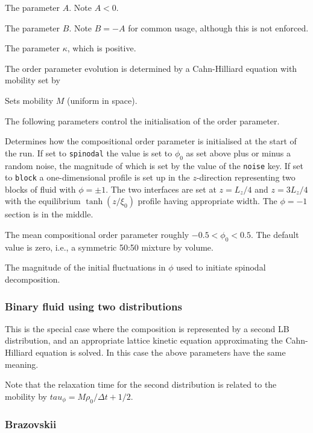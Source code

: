  The parameter $A$. Note $A < 0$.

 The parameter $B$. Note $B = -A$ for common usage,
although this is not enforced.

 The parameter $\kappa$, which is positive.

The order parameter evolution is determined by a Cahn-Hilliard equation
with mobility set by

 Sets mobility $M$ (uniform in space).

The following parameters control the initialisation of the order
parameter.


Determines how the compositional order parameter is initialised
at the start of the run. If set to \texttt{spinodal} the value
is set to $\phi_0$ as set above plus or minus a random noise, the
magnitude of which is set by the value of the \texttt{noise} key.
If set to \texttt{block} a one-dimensional profile is set up in
the $z$-direction representing two blocks of fluid with
$\phi = \pm 1$. The two interfaces are set at $z = L_z/4$ and
$z = 3L_z/4$ with the equilibrium $\tanh(z/\xi_0)$ profile having 
appropriate width. The $\phi = -1$ section is in the middle.


The mean compositional order parameter roughly $-0.5 < \phi_0 < 0.5$.
The default value is zero, i.e., a symmetric 50:50 mixture by volume.


The magnitude of the initial fluctuations in $\phi$ used to
initiate spinodal decomposition.

\subsubsection{Binary fluid using two distributions}


This is the special case where the composition is represented
by a second LB distribution, and an appropriate lattice kinetic
equation approximating the Cahn-Hilliard equation is solved.
In this case the above parameters have the same meaning.

Note that the relaxation time for the second distribution is
related to the mobility by $tau_\phi = M\rho_0/\Delta t + 1/2$.


\subsubsection{Brazovskii}

